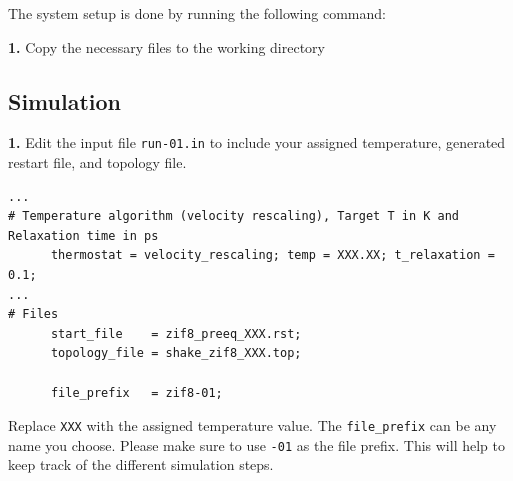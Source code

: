 \documentclass[
  letterpaper,
]{article}
\newenvironment{Shaded}{\begin{snugshade}}{\end{snugshade}}
\newcommand{\FunctionTok}[1]{\textcolor[rgb]{0.28,0.35,0.67}{#1}}
\newcommand{\NormalTok}[1]{\textcolor[rgb]{0.00,0.23,0.31}{#1}}
\newcommand{\OperatorTok}[1]{\textcolor[rgb]{0.37,0.37,0.37}{#1}}
\newcommand{\PreprocessorTok}[1]{\textcolor[rgb]{0.68,0.00,0.00}{#1}}
\newcommand{\VariableTok}[1]{\textcolor[rgb]{0.07,0.07,0.07}{#1}}
\begin{document}

The system setup is done by running the following command:

\textbf{1.} Copy the necessary files to the working directory

\begin{Shaded}
\end{Shaded}

\hypertarget{simulation-1}{%
\subsection*{Simulation}\label{simulation-1}}


\textbf{1.} Edit the input file \texttt{run-01.in} to include your
assigned temperature, generated restart file, and topology file.

\begin{verbatim}
...
# Temperature algorithm (velocity rescaling), Target T in K and Relaxation time in ps
      thermostat = velocity_rescaling; temp = XXX.XX; t_relaxation = 0.1;
...
# Files
      start_file    = zif8_preeq_XXX.rst;
      topology_file = shake_zif8_XXX.top;

      file_prefix   = zif8-01;
\end{verbatim}

\begin{tcolorbox}[enhanced jigsaw, opacitybacktitle=0.6, colback=white, rightrule=.15mm, bottomrule=.15mm, coltitle=black, toprule=.15mm, bottomtitle=1mm, arc=.35mm, colframe=quarto-callout-note-color-frame, opacityback=0, toptitle=1mm, breakable, titlerule=0mm, left=2mm, title=\textcolor{quarto-callout-note-color}{\faInfo}\hspace{0.5em}{Note}, leftrule=.75mm, colbacktitle=quarto-callout-note-color!10!white]

Replace \texttt{XXX} with the assigned temperature value. The
\texttt{file\_prefix} can be any name you choose. Please make sure to
use \texttt{-01} as the file prefix. This will help to keep track of the
different simulation steps.

\end{tcolorbox}
\end{document}
